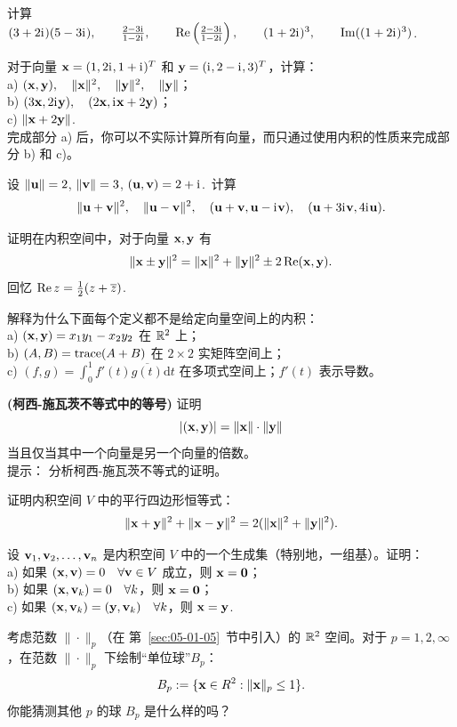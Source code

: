 \begin{problemset}
\item \label{ex:05-01-01} 计算
 \\
 $(3 + 2\mathrm{i}\mkern1mu)(5 - 3\mathrm{i}\mkern1mu), \quad  \quad \frac{2 - 3\mathrm{i}\mkern1mu}{1 - 2\mathrm{i}\mkern1mu}, \quad  \quad \operatorname{Re}\left(\frac{2 - 3\mathrm{i}\mkern1mu}{1 - 2\mathrm{i}\mkern1mu}\right) , \quad  \quad (1 + 2\mathrm{i}\mkern1mu)^3, \quad  \quad \operatorname{Im}((1 + 2\mathrm{i}\mkern1mu)^3)$.
\item \label{ex:05-01-02} 对于向量 $\mathbf{x} = (1, 2\mathrm{i}\mkern1mu, 1 + \mathrm{i}\mkern1mu)^T$ 和 $\mathbf{y} = (\mathrm{i}\mkern1mu, 2 - \mathrm{i}\mkern1mu, 3)^T$，计算：
\\
    a) $(\mathbf{x}, \mathbf{y}), \quad \|\mathbf{x}\|^2, \quad \|\mathbf{y}\|^2, \quad \|\mathbf{y}\|$；
    \\
    b) $(3\mathbf{x}, 2\mathrm{i}\mkern1mu \mathbf{y}), \quad (2\mathbf{x}, \mathrm{i}\mkern1mu\mathbf{x} + 2\mathbf{y})$；
    \\
    c) $\|\mathbf{x} + 2\mathbf{y}\|$.~
    \\
完成部分 a) 后，你可以不实际计算所有向量，而只通过使用内积的性质来完成部分 b) 和 c)。
\item \label{ex:05-01-03} 设 $\|\mathbf{u}\| = 2$, $\|\mathbf{v}\| = 3$, $(\mathbf{u}, \mathbf{v}) = 2 + \mathrm{i}\mkern1mu$.~计算
$$\|\mathbf{u} + \mathbf{v}\|^2, \quad \|\mathbf{u} - \mathbf{v}\|^2, \quad (\mathbf{u} + \mathbf{v}, \mathbf{u} - \mathrm{i}\mkern1mu \mathbf{v}), \quad (\mathbf{u} + 3\mathrm{i}\mkern1mu \mathbf{v}, 4\mathrm{i}\mkern1mu \mathbf{u}).$$
\item \label{ex:05-01-04} 证明在内积空间中，对于向量 $\mathbf{x}, \mathbf{y}$ 有
$$\|\mathbf{x} \pm \mathbf{y}\|^2 = \|\mathbf{x}\|^2 + \|\mathbf{y}\|^2 \pm 2 \operatorname{Re}(\mathbf{x}, \mathbf{y}).$$
回忆 $\operatorname{Re} z = \frac{1}{2}(z + \overline{z})$.
\item \label{ex:05-01-05} 解释为什么下面每个定义都不是给定向量空间上的内积：
\\
    a) $(\mathbf{x}, \mathbf{y}) = x_1 y_1 - x_2 y_2$ 在 $\mathbb{R}^2$ 上；
    \\
    b) $(A, B) = \operatorname{trace}(A + B)$ 在 $2 \times 2$ 实矩阵空间上；
    \\
    c) $(f, g) = \int_0^1 f'(t) \overline{g(t)} \mathrm{d}t$ 在多项式空间上；$f'(t)$ 表示导数。
\item \label{ex:05-01-06} \textbf{(柯西-施瓦茨不等式中的等号)} 证明 $$|(\mathbf{x}, \mathbf{y})| = \|\mathbf{x}\| \cdot \|\mathbf{y}\|$$
当且仅当其中一个向量是另一个向量的倍数。
\\
    {\heiti 提示：} 分析柯西-施瓦茨不等式的证明。
\item \label{ex:05-01-07} 证明内积空间 $V$ 中的平行四边形恒等式：$$\|\mathbf{x} + \mathbf{y}\|^2 + \|\mathbf{x} - \mathbf{y}\|^2 = 2(\|\mathbf{x}\|^2 + \|\mathbf{y}\|^2).$$
\item \label{ex:05-01-08} 设 $\mathbf{v}_1, \mathbf{v}_2, \dots, \mathbf{v}_n$ 是内积空间 $V$ 中的一个生成集（特别地，一组基）。证明：
\\
    a) 如果 $(\mathbf{x}, \mathbf{v}) = 0 \quad \forall \mathbf{v} \in V$ 成立，则 $\mathbf{x} = \mathbf{0}$；
    \\
    b) 如果 $(\mathbf{x}, \mathbf{v}_k) = 0 \quad \forall k$，则 $\mathbf{x} = \mathbf{0}$；
    \\
    c) 如果 $(\mathbf{x}, \mathbf{v}_k) = (\mathbf{y}, \mathbf{v}_k) \quad \forall k$，则 $\mathbf{x} = \mathbf{y}$.~
\item \label{ex:05-01-09} 考虑范数 $\| \cdot \|_p$（在 第~\ref{sec:05-01-05}~节中引入）的 $\mathbb{R}^2$ 空间。对于 $p = 1, 2, \infty$，在范数 $\| \cdot \|_p$ 下绘制“单位球”$B_p$：
$$B_p := \{\mathbf{x} \in R^2 : \|\mathbf{x}\|_p \le 1\}.$$
你能猜测其他 $p$ 的球 $B_p$ 是什么样的吗？
\end{problemset}


